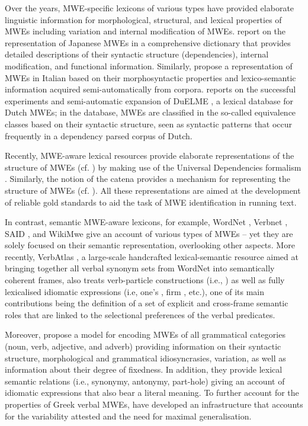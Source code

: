 \documentclass[output=paper,colorlinks,citecolor=brown]{langscibook}
\begin{document}
Over the years, MWE-specific lexicons of various types have provided elaborate linguistic information for morphological, structural, and lexical properties of MWEs including variation and internal modification of MWEs. \citet{shudo_etal_2011} report on the representation of Japanese MWEs in a comprehensive dictionary that provides detailed descriptions of their syntactic structure (dependencies), internal modification, and functional information. Similarly, \citet{zaninello_nissim_2010} propose a representation of MWEs in Italian based on their morphosyntactic properties and lexico-semantic information acquired semi-automatically from corpora. \citet{odijk_2013} reports on the successful experiments and semi-automatic expansion of DuELME \citep{gregoire_duelme_2010}, a lexical database for Dutch MWEs; in the database, MWEs are classified in the so-called equivalence classes based on their syntactic structure, seen as syntactic patterns that occur frequently in a dependency parsed corpus of Dutch. 

Recently, MWE-aware lexical resources provide elaborate representations of the structure of MWEs (cf. ) by making use of the Universal Dependencies formalism \citep{NIVRE16.348}. Similarly, the notion of the catena provides a mechanism for representing the structure of MWEs
(cf. ). All these representations are aimed at the development of reliable gold standards to aid the task of MWE identification in running text.

In contrast, semantic MWE-aware lexicons, for example, WordNet \citep{fellbaum_wordnet_1998}, Verbnet \citep{kipper_etal_2008}, SAID \citep{kuiper_etal_2003}, and WikiMwe \citep{hartmann_etal_2012} give an account of various types of MWEs – yet they are solely focused on their semantic representation, overlooking other aspects. More recently, \mbox{VerbAtlas} \citep{di_fabio_etal_2019}, a large-scale handcrafted lexical-semantic resource aimed at bringing together all verbal synonym sets from WordNet into semantically coherent frames, also treats verb-particle constructions (i.e., ) as well as fully lexicalised idiomatic expressions (i.e,  one’s ,  firm , etc.), one of its main contributions being the definition of a set of explicit and cross-frame semantic roles that are linked to the selectional preferences of the verbal predicates.

Moreover, \citet{fotopoulou_etal_2014} propose a model for encoding MWEs of all grammatical categories (noun, verb, adjective, and adverb) providing information on their syntactic structure, morphological and grammatical idiosyncrasies, variation, as well as information about their degree of fixedness. In addition, they provide lexical semantic relations (i.e., synonymy, antonymy, part-hole) giving an account of idiomatic expressions that also bear a literal meaning. To further account for the properties of Greek verbal MWEs, \citet{markantonatou-etal-2019-idion} have developed an infrastructure that accounts for the variability attested and the need for maximal generalisation.
\end{document}
